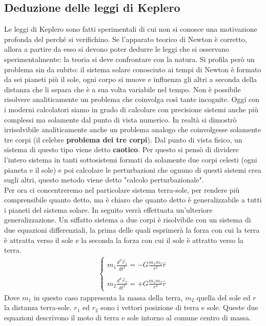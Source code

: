 \documentclass[10pt,a4paper]{article}
\begin{document}
\subsection{Deduzione delle leggi di Keplero}
Le leggi di Keplero sono fatti sperimentali di cui non si conosce una motivazione profonda del perché si verifichino. Se l'apparato teorico di Newton è corretto, allora a partire da esso si devono poter dedurre le leggi che si osservano sperimentalmente: la teoria si deve confrontare con la natura.  Si profila però un problema sin da subito: il sistema solare conosciuto ai tempi di Newton è formato da sei pianeti più il sole, ogni corpo si muove e influenza gli altri a seconda della distanza che li separa che è a sua volta variabile nel tempo. Non è possibile risolvere analiticamente un problema che coinvolga così tante incognite. Oggi con i moderni calcolatori siamo in grado di calcolare con precisione sistemi anche più complessi ma solamente dal punto di vista numerico. In realtà si dimostrò irrisolvibile analiticamente anche un problema analogo che coinvolgesse solamente tre corpi (il celebre \textbf{problema dei tre corpi}). Dal punto di vista fisico, un sistema di questo tipo viene detto \textbf{caotico}. Per questo si pensò di dividere l'intero sistema in tanti sottosistemi formati da solamente due corpi celesti (ogni pianeta e il sole) e poi calcolare le perturbazioni che ognuno di questi sistemi crea sugli altri, questo metodo viene detto "calcolo perturbazionale".\\
Per ora ci concentreremo nel particolare sistema terra-sole, per rendere più comprensibile quanto detto, ma è chiaro che quanto detto è generalizzabile a tutti i pianeti del sistema solare. In seguito verrà effettuata un'ulteriore generalizzazione. Un siffatto sistema a due corpi è risolvibile con un sistema di due equazioni differenziali, la prima delle quali esprimerà la forza con cui la terra è attratta verso il sole e la seconda la forza con cui il sole è attratto verso la terra.
\begin{align*}
\begin{cases}
	m_1\frac{d^2\vec{r}_1}{dt^2} = -G\frac{m_1m_2}{r^2}\hat{r}\\\\
	m_2\frac{d^2\vec{r}_2}{dt^2} = +G\frac{m_1m_2}{r^2}\hat{r}
\end{cases}
\end{align*}
Dove $m_1$ in questo caso rappresenta la massa della terra, $m_2$ quella del sole ed $r$ la distanza terra-sole. $r_1$ ed $r_2$ sono i vettori posizione di terra e sole. Queste due equazioni descrivono il moto di terra e sole intorno al comune centro di massa. \\
\end{document}
